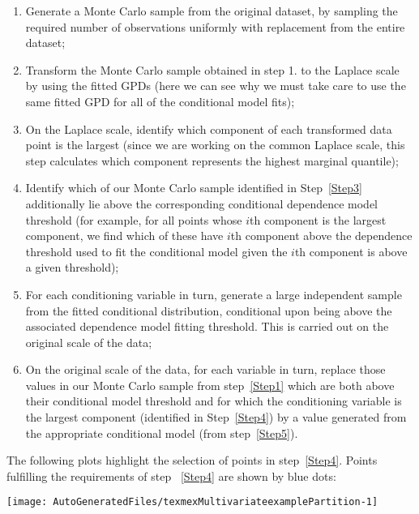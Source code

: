\documentclass[10pt]{article}\usepackage[]{graphicx}\usepackage[]{color}
\makeatletter
\def\maxwidth{ %
  \ifdim\Gin@nat@width>\linewidth
    \linewidth
  \else
    \Gin@nat@width
  \fi
}
\newenvironment{knitrout}{}{} %
\makeatother
\begin{document}
\begin{enumerate}
\item \label{Step1} Generate a Monte Carlo sample from the original dataset, by sampling the required number of observations uniformly with replacement from the entire dataset;
\item Transform the Monte Carlo sample obtained in step 1. to the Laplace scale by using the fitted GPDs (here we can see why we must take care to use the same fitted GPD for all of the conditional model fits);
\item \label{Step3} On the Laplace scale, identify which component of each transformed data point is the largest (since we are working on the common Laplace scale, this step calculates which component represents the highest marginal quantile);
\item \label{Step4} Identify which of our Monte Carlo sample identified in Step~\ref{Step3} additionally lie above the corresponding conditional dependence model threshold (for example, for all points whose $i$th component is the largest component, we find which of these have $i$th component above the dependence threshold used to fit the conditional model given the $i$th component is above a given threshold);
\item\label{Step5} For each conditioning variable in turn, generate a large independent sample from the fitted conditional distribution, conditional upon being above the associated dependence model fitting threshold.  This is carried out on the original scale of the data;
\item On the original scale of the data, for each variable in turn, replace those values in our Monte Carlo sample from step~\ref{Step1} which are both above their conditional model threshold and for which the conditioning variable is the largest component (identified in Step~\ref{Step4}) by a value generated from the appropriate conditional model (from step~\ref{Step5}).
\end{enumerate}

The following plots highlight the selection of points in step~\ref{Step4}. Points fulfilling the requirements of step ~\ref{Step4} are shown by blue dots:

\begin{knitrout}
\color{fgcolor}
\texttt{[image: AutoGeneratedFiles/texmexMultivariateexamplePartition-1]} 

\end{knitrout}
\end{document}
